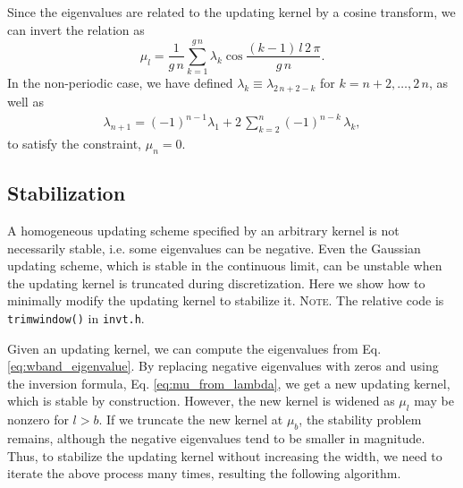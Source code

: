 \documentclass[reprint, superscriptaddress, floatfix]{revtex4-1}
\newcommand{\note}[1]{{\color{DarkGreen}\footnotesize \textsc{Note.} #1}}
\begin{document}
Since the eigenvalues are related to the updating kernel
by a cosine transform,
we can invert the relation as
%
\begin{equation}
  \mu_l
  =
  \frac { 1 } { g \, n }
  \sum_{ k = 1 }^{ g \, n }
  \lambda_k
  \cos \frac{ (k - 1) \, l \, 2 \, \pi }
            {            g \, n        }
  .
\label{eq:mu_from_lambda}
\end{equation}
%
In the non-periodic case,
we have defined
$\lambda_k \equiv \lambda_{2 \, n + 2 - k}$
for $k = n + 2, \dots, 2 \, n$,
as well as
%
\begin{align}
  \lambda_{ n + 1 }
  =
  (-1)^{ n - 1 }
  \lambda_1
  +
  2 \, \sum_{ k = 2 }^{ n }
      (-1)^{n - k} \, \lambda_k
  ,
\label{eq:lambdan}
\end{align}
to satisfy the constraint, $\mu_n = 0$.
%





\subsection{\label{sec:stabilize_wband}
Stabilization}



%
A homogeneous updating scheme
specified by an arbitrary kernel
is not necessarily stable,
i.e. some eigenvalues can be negative.
%
%
Even
the Gaussian updating scheme, which is stable in the continuous limit,
can be unstable
when the updating kernel is truncated during discretization.
%
Here we show how to minimally modify
the updating kernel
to stabilize it.
%
\note{The relative code is \texttt{trimwindow()} in \texttt{invt.h}.
}


Given an updating kernel,
we can compute the eigenvalues from
Eq. \eqref{eq:wband_eigenvalue}.
%
By replacing negative eigenvalues with zeros and
using the inversion formula,
Eq. \eqref{eq:mu_from_lambda},
we get a new updating kernel,
which is stable by construction.
%
However, the new kernel is widened
as $\mu_l$ may be nonzero for $l > b$.
%
If we truncate the new kernel at $\mu_b$,
the stability problem remains,
although the negative eigenvalues
tend to be smaller in magnitude.
%
Thus, to stabilize the updating kernel
without increasing the width,
we need to iterate the above process many times,
resulting the following algorithm.
\end{document}

